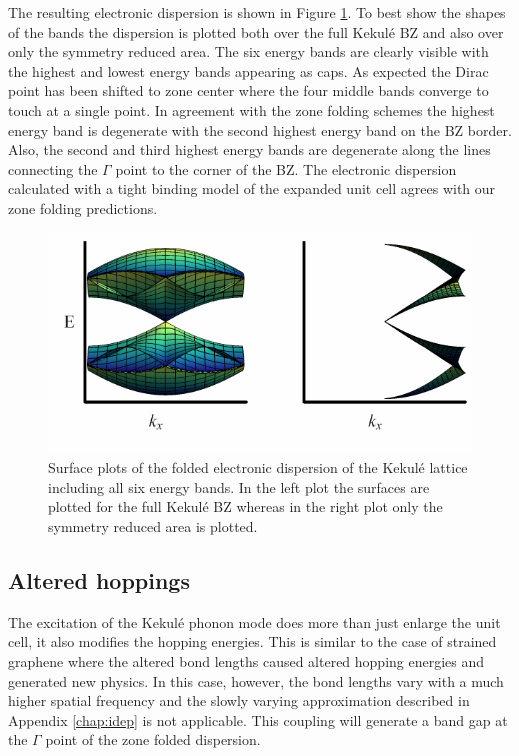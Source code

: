 The resulting electronic dispersion is shown in Figure \ref{fig:kek:zfdisp}.
To best show the shapes of the bands the dispersion is plotted both over the full Kekul\'e BZ and also over only the symmetry reduced area.
The six energy bands are clearly visible with the highest and lowest energy bands appearing as caps.
As expected the Dirac point has been shifted to zone center where the four middle bands converge to touch at a single point.
In agreement with the zone folding schemes the highest energy band is degenerate with the second highest energy band on the BZ border.
Also, the second and third highest energy bands are degenerate along the lines connecting the $\Gamma$ point to the corner of the BZ.
The electronic dispersion calculated with a tight binding model of the expanded unit cell agrees with our zone folding predictions.

\begin{figure}
	\begin{center}
	\includegraphics{Figs_Kekule/ZoneFolded.pdf}
	\end{center}
	\caption[Surface plots of the folded electronic dispersion of the Kekul\'e lattice]{\label{fig:kek:zfdisp}
		Surface plots of the folded electronic dispersion of the Kekul\'e lattice including all six energy bands.
		In the left plot the surfaces are plotted for the full Kekul\'e BZ whereas in the right plot only the symmetry reduced area is plotted.
	}
\end{figure}

\subsection{Altered hoppings}
The excitation of the Kekul\'e phonon mode does more than just enlarge the unit cell, it also modifies the hopping energies.
This is similar to the case of strained graphene where the altered bond lengths caused altered hopping energies and generated new physics.
In this case, however, the bond lengths vary with a much higher spatial frequency and the slowly varying approximation described in Appendix \ref{chap:idep} is not applicable.
This coupling will generate a band gap at the $\Gamma$ point of the zone folded dispersion.

